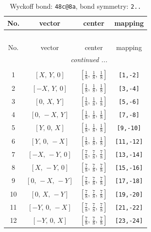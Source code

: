 \documentclass[fleqn,8pt]{jsarticle}
\begin{document}
\begin{longtable}{cccc}
\caption{Wyckoff bond: {\tt 48c@8a}, bond symmetry: {\tt 2..}}
 \\
 \hline \hline
No. & vector & center & mapping \\ \hline \endfirsthead

\multicolumn{3}{l}{\tablename\ \thetable{}} \\
 \hline \hline
No. & vector & center & mapping \\ \hline \endhead

 \hline \hline
\multicolumn{3}{r}{\footnotesize\it continued ...} \\ \endfoot

 \hline \hline
\multicolumn{3}{r}{} \\ \endlastfoot

1 & $\left[ X,\, Y,\, 0 \right]$ & $\left[ \frac{1}{8},\, \frac{1}{8},\, \frac{1}{8} \right]$ & {\tt [1,-2]} \\ \hline
2 & $\left[ - X,\, Y,\, 0 \right]$ & $\left[ \frac{1}{8},\, \frac{1}{8},\, \frac{1}{8} \right]$ & {\tt [3,-4]} \\ \hline
3 & $\left[ 0,\, X,\, Y \right]$ & $\left[ \frac{1}{8},\, \frac{1}{8},\, \frac{1}{8} \right]$ & {\tt [5,-6]} \\ \hline
4 & $\left[ 0,\, - X,\, Y \right]$ & $\left[ \frac{1}{8},\, \frac{1}{8},\, \frac{1}{8} \right]$ & {\tt [7,-8]} \\ \hline
5 & $\left[ Y,\, 0,\, X \right]$ & $\left[ \frac{1}{8},\, \frac{1}{8},\, \frac{1}{8} \right]$ & {\tt [9,-10]} \\ \hline
6 & $\left[ Y,\, 0,\, - X \right]$ & $\left[ \frac{1}{8},\, \frac{1}{8},\, \frac{1}{8} \right]$ & {\tt [11,-12]} \\ \hline
7 & $\left[ - X,\, - Y,\, 0 \right]$ & $\left[ \frac{7}{8},\, \frac{7}{8},\, \frac{7}{8} \right]$ & {\tt [13,-14]} \\ \hline
8 & $\left[ X,\, - Y,\, 0 \right]$ & $\left[ \frac{7}{8},\, \frac{7}{8},\, \frac{7}{8} \right]$ & {\tt [15,-16]} \\ \hline
9 & $\left[ 0,\, - X,\, - Y \right]$ & $\left[ \frac{7}{8},\, \frac{7}{8},\, \frac{7}{8} \right]$ & {\tt [17,-18]} \\ \hline
10 & $\left[ 0,\, X,\, - Y \right]$ & $\left[ \frac{7}{8},\, \frac{7}{8},\, \frac{7}{8} \right]$ & {\tt [19,-20]} \\ \hline
11 & $\left[ - Y,\, 0,\, - X \right]$ & $\left[ \frac{7}{8},\, \frac{7}{8},\, \frac{7}{8} \right]$ & {\tt [21,-22]} \\ \hline
12 & $\left[ - Y,\, 0,\, X \right]$ & $\left[ \frac{7}{8},\, \frac{7}{8},\, \frac{7}{8} \right]$ & {\tt [23,-24]} \\
\end{longtable}
\end{document}
